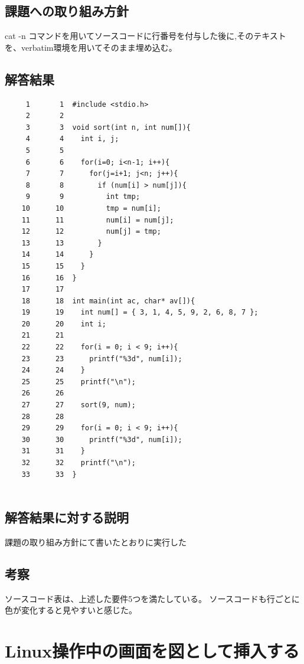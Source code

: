 \documentclass[fontsize = 14pt, paper= a4]{jlreq}
\begin{document}
\subsection{課題への取り組み方針}
cat -n コマンドを用いてソースコードに行番号を付与した後に,そのテキストを、verbatim環境を用いてそのまま埋め込む。
\subsection{解答結果}

\begin{verbatim}
     1       1  #include <stdio.h>
     2       2
     3       3  void sort(int n, int num[]){
     4       4    int i, j;
     5       5
     6       6    for(i=0; i<n-1; i++){
     7       7      for(j=i+1; j<n; j++){
     8       8        if (num[i] > num[j]){
     9       9          int tmp;
    10      10          tmp = num[i];
    11      11          num[i] = num[j];
    12      12          num[j] = tmp;
    13      13        }
    14      14      }
    15      15    }
    16      16  }
    17      17
    18      18  int main(int ac, char* av[]){
    19      19    int num[] = { 3, 1, 4, 5, 9, 2, 6, 8, 7 };
    20      20    int i;
    21      21
    22      22    for(i = 0; i < 9; i++){
    23      23      printf("%3d", num[i]);
    24      24    }
    25      25    printf("\n");
    26      26
    27      27    sort(9, num);
    28      28
    29      29    for(i = 0; i < 9; i++){
    30      30      printf("%3d", num[i]);
    31      31    }
    32      32    printf("\n");
    33      33  }


\end{verbatim}

\subsection{解答結果に対する説明}

課題の取り組み方針にて書いたとおりに実行した

\subsection{考察}

ソースコード表は、上述した要件5つを満たしている。
ソースコードも行ごとに色が変化すると見やすいと感じた。

\section{Linux操作中の画面を図として挿入する}
\end{document}
